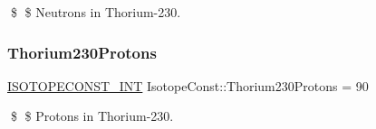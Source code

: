 \$ \$ Neutrons in Thorium-\/230. \mbox{\label{group___isotope_const-_thorium-_th230_ga3c454187732d7edfd9bd49887594147e}} 
\subsubsection{\texorpdfstring{Thorium230\+Protons}{Thorium230Protons}}
{\footnotesize\ttfamily \mbox{\hyperlink{group___isotope_const-_macros_ga5f18360b3e99483a35c32d789e62621c}{I\+S\+O\+T\+O\+P\+E\+C\+O\+N\+S\+T\+\_\+\+I\+NT}} Isotope\+Const\+::\+Thorium230\+Protons = 90}

\$ \$ Protons in Thorium-\/230. 